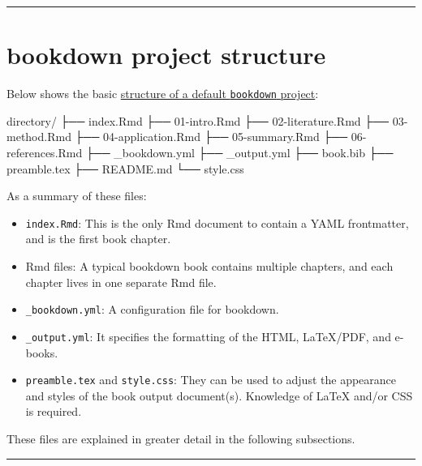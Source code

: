 \documentclass[
]{book}
\newenvironment{Shaded}{\begin{snugshade}}{\end{snugshade}}
\newcommand{\NormalTok}[1]{#1}
\theoremstyle{definition}
\theoremstyle{definition}
\theoremstyle{definition}
\theoremstyle{definition}
\theoremstyle{remark}
\begin{document}
\begin{center}\rule{0.5\linewidth}{0.5pt}\end{center}

\section{bookdown project structure}\label{bookdown-project-structure}

Below shows the basic \href{https://bookdown.org/yihui/rmarkdown/bookdown-project.html}{structure of a default \texttt{bookdown} project}:

\begin{Shaded}
\begin{Highlighting}[]
\NormalTok{directory/}
\NormalTok{├──  index.Rmd}
\NormalTok{├── 01{-}intro.Rmd}
\NormalTok{├── 02{-}literature.Rmd}
\NormalTok{├── 03{-}method.Rmd}
\NormalTok{├── 04{-}application.Rmd}
\NormalTok{├── 05{-}summary.Rmd}
\NormalTok{├── 06{-}references.Rmd}
\NormalTok{├── \_bookdown.yml}
\NormalTok{├── \_output.yml}
\NormalTok{├──  book.bib}
\NormalTok{├──  preamble.tex}
\NormalTok{├──  README.md}
\NormalTok{└──  style.css}
\end{Highlighting}
\end{Shaded}

As a summary of these files:

\begin{itemize}
\item
  \texttt{index.Rmd}: This is the only Rmd document to contain a YAML frontmatter, and is the first book chapter.
\item
  Rmd files: A typical bookdown book contains multiple chapters, and each chapter lives in one separate Rmd file.
\item
  \texttt{\_bookdown.yml}: A configuration file for bookdown.
\item
  \texttt{\_output.yml}: It specifies the formatting of the HTML, LaTeX/PDF, and e-books.
\item
  \texttt{preamble.tex} and \texttt{style.css}: They can be used to adjust the appearance and styles of the book output document(s). Knowledge of LaTeX and/or CSS is required.
\end{itemize}

These files are explained in greater detail in the following subsections.

\begin{center}\rule{0.5\linewidth}{0.5pt}\end{center}
\end{document}
